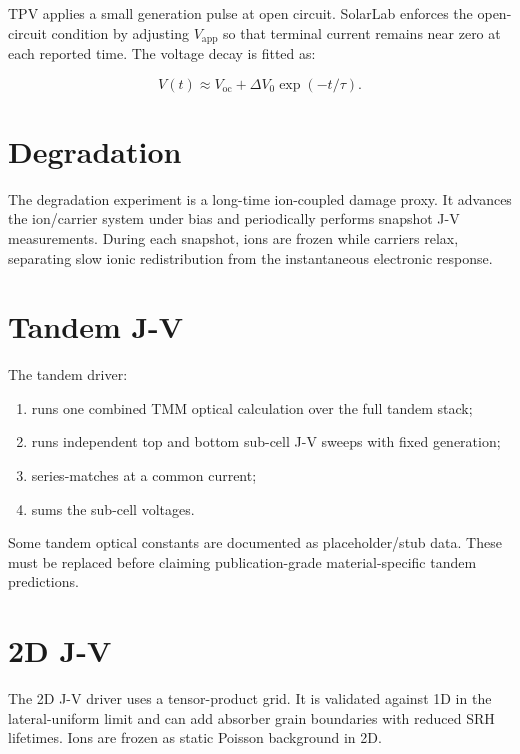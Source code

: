 \documentclass[
  11pt,
  american,
]{report}
\providecommand{\tightlist}{%
  \setlength{\itemsep}{0pt}\setlength{\parskip}{0pt}}
\begin{document}
TPV applies a small generation pulse at open circuit. SolarLab enforces
the open-circuit condition by adjusting \(V_\mathrm{app}\) so that
terminal current remains near zero at each reported time. The voltage
decay is fitted as:

\[
V(t)
\approx
V_\mathrm{oc}
+\Delta V_0\exp(-t/\tau).
\]

\hypertarget{degradation}{%
\section{Degradation}\label{degradation}}

The degradation experiment is a long-time ion-coupled damage proxy. It
advances the ion/carrier system under bias and periodically performs
snapshot J-V measurements. During each snapshot, ions are frozen while
carriers relax, separating slow ionic redistribution from the
instantaneous electronic response.

\hypertarget{tandem-j-v}{%
\section{Tandem J-V}\label{tandem-j-v}}

The tandem driver:

\begin{enumerate}
\def\labelenumi{\arabic{enumi}.}
\tightlist
\item
  runs one combined TMM optical calculation over the full tandem stack;
\item
  runs independent top and bottom sub-cell J-V sweeps with fixed
  generation;
\item
  series-matches at a common current;
\item
  sums the sub-cell voltages.
\end{enumerate}

Some tandem optical constants are documented as placeholder/stub data.
These must be replaced before claiming publication-grade
material-specific tandem predictions.

\hypertarget{d-j-v}{%
\section{2D J-V}\label{d-j-v}}

The 2D J-V driver uses a tensor-product grid. It is validated against 1D
in the lateral-uniform limit and can add absorber grain boundaries with
reduced SRH lifetimes. Ions are frozen as static Poisson background in
2D.
\end{document}
